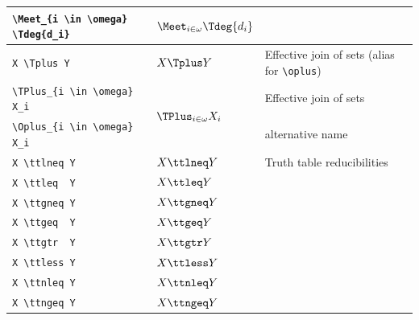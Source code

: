 \documentclass[leqno,11pt]{amsart}
\newcommand{\tab}{\hspace{1cm}}
\begin{document}
\begin{xtabular}{l |  l | l}
	\tab \verb=\Meet_{i \in \omega} \Tdeg{d_i}= &  \( \Meet_{i \in \omega} \Tdeg{d_i} \)    & \\
	 \midrule
	\verb=X \Tplus Y=     & \( 	X \Tplus Y                            	   \)   & Effective join of sets (alias for \verb=\oplus=) \\ \midrule
	\verb=\TPlus_{i \in \omega} X_i=                       &    &  Effective join of sets    \\
	\tab \verb=\Oplus_{i \in \omega} X_i=  & & alternative name \\  \midrule
	
	\verb=X \ttlneq Y=                                     & \( 	X \ttlneq Y                           	   \)   & Truth table reducibilities \\ \midrule
	\verb=X \ttleq  Y=                                     & \( 	X \ttleq  Y                           	   \)   & \\ \midrule
	\verb=X \ttgneq Y=                                     & \( 	X \ttgneq Y                           	   \)   & \\ \midrule
	\verb=X \ttgeq  Y=                                     & \( 	X \ttgeq  Y                           	   \)   & \\ \midrule
	\verb=X \ttgtr  Y=                                     & \( 	X \ttgtr  Y                           	   \)   & \\ \midrule
	\verb=X \ttless Y=                                     & \( 	X \ttless Y                           	   \)   & \\ \midrule
	\verb=X \ttnleq Y=                                     & \( 	X \ttnleq Y                           	   \)   & \\ \midrule
        \verb=X \ttngeq Y=                                     & \(  X \ttngeq Y                             	   \)   & \\ \midrule


\end{xtabular}
\end{document}
